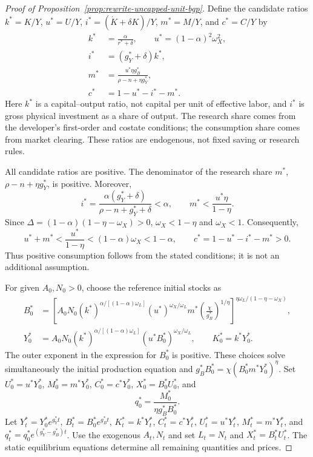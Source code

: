 \begin{proof}[Proof of Proposition~\ref{prop:rewrite-uncapped-unit-bgp}]
Define the candidate ratios $k^*=K/Y$, $u^*=U/Y$,
$i^*=(\dot K+\delta K)/Y$, $m^*=M/Y$, and $c^*=C/Y$ by
\begin{align}
 k^*&=\frac{\alpha}{r^*+\delta},\qquad u^*=(1-\alpha)^2\omega_X^2,
 \label{eq:rewrite-uncapped-unit-capital-inference}\\
 i^*&=(g_Y^*+\delta)k^*,
 \label{eq:rewrite-uncapped-unit-investment}\\
 m^*&=\frac{u^*\eta g_B^*}{\rho-n+\eta g_Y^*},
 \label{eq:rewrite-uncapped-unit-research-share}\\
 c^*&=1-u^*-i^*-m^*.
 \label{eq:rewrite-uncapped-unit-consumption}
\end{align}
Here $k^*$ is a capital--output ratio, not capital per unit of effective
labor, and $i^*$ is gross physical investment as a share of output.
The research share comes from the developer's first-order and costate
conditions; the consumption share comes from market clearing.
These ratios are endogenous, not fixed saving or research rules.

All candidate ratios are positive. The denominator of the research share $m^*$,
$\rho-n+\eta g_Y^*$, is positive. Moreover,
\[
 i^*=\frac{\alpha(g_Y^*+\delta)}{\rho-n+g_Y^*+\delta}<\alpha,
 \qquad
 m^*<\frac{u^*\eta}{1-\eta}.
\]
Since $\Delta=(1-\alpha)(1-\eta-\omega_X)>0$,
$\omega_X<1-\eta$ and $\omega_X<1$. Consequently,
\[
 u^*+m^*<\frac{u^*}{1-\eta}<(1-\alpha)\omega_X<1-\alpha,
 \qquad c^*=1-u^*-i^*-m^*>0.
\]
Thus positive consumption follows from the stated conditions; it is not
an additional assumption.

For given $A_0,N_0>0$, choose the reference initial stocks as
\begin{align}
 B_0^*&=\left[
 A_0N_0(k^*)^{\alpha/[(1-\alpha)\omega_L]}(u^*)^{\omega_X/\omega_L}
 m^*\left(\frac{\chi}{g_B^*}\right)^{1/\eta}
 \right]^{\eta\omega_L/(1-\eta-\omega_X)},
 \label{eq:rewrite-uncapped-unit-initial-b}\\
 Y_0^*&=A_0N_0(k^*)^{\alpha/[(1-\alpha)\omega_L]}
 (u^*B_0^*)^{\omega_X/\omega_L},
 \qquad K_0^*=k^*Y_0^*.
 \label{eq:rewrite-uncapped-unit-initial-y-k}
\end{align}
The outer exponent in the expression for $B_0^*$ is positive. These
choices solve simultaneously the initial production equation and
$g_B^*B_0^*=\chi(B_0^*m^*Y_0^*)^\eta$.
Set $U_0^*=u^*Y_0^*$, $M_0^*=m^*Y_0^*$, $C_0^*=c^*Y_0^*$,
$X_0^*=B_0^*U_0^*$, and
\begin{equation}
 q_0^*=\frac{M_0^*}{\eta g_B^*B_0^*}.
 \label{eq:rewrite-uncapped-unit-initial-q}
\end{equation}
Let $Y_t^*=Y_0^*e^{g_Y^*t}$, $B_t^*=B_0^*e^{g_B^*t}$,
$K_t^*=k^*Y_t^*$, $C_t^*=c^*Y_t^*$, $U_t^*=u^*Y_t^*$,
$M_t^*=m^*Y_t^*$, and $q_t^*=q_0^*e^{(g_Y^*-g_B^*)t}$.
Use the exogenous $A_t,N_t$ and set $L_t=N_t$ and $X_t^*=B_t^*U_t^*$.
The static equilibrium equations determine all remaining quantities and prices.


\end{proof}
